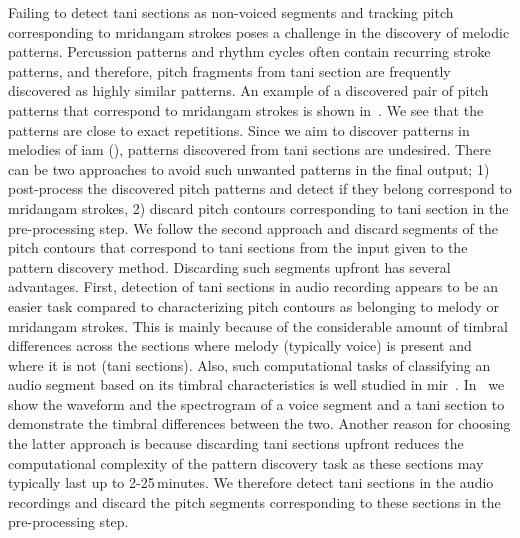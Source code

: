 {Failing to detect \gls{tani} sections as non-voiced segments and tracking pitch corresponding to \gls{mridangam} strokes poses a challenge in the discovery of melodic patterns. Percussion patterns and rhythm cycles often contain recurring stroke patterns, and therefore, pitch fragments from \gls{tani} section are frequently discovered as highly similar patterns. An example of a discovered pair of pitch patterns that correspond to \gls{mridangam} strokes is shown in~. We see that the patterns are close to exact repetitions. Since we aim to discover patterns in melodies of \gls{iam} (), patterns discovered from \gls{tani} sections are undesired. There can be two approaches to avoid such unwanted patterns in the final output; 1) post-process the discovered pitch patterns and detect if they belong correspond to \gls{mridangam} strokes, 2) discard pitch contours corresponding to \gls{tani} section in the pre-processing step. We follow the second approach and discard segments of the pitch contours that correspond to \gls{tani} sections from the input given to the pattern discovery method. Discarding such segments upfront has several advantages. First, detection of \gls{tani} sections in audio recording appears to be an easier task compared to characterizing pitch contours as belonging to melody or \gls{mridangam} strokes. This is mainly because of the considerable amount of timbral differences across the sections where melody (typically voice) is present and where it is not (\gls{tani} sections). Also, such computational tasks of classifying an audio segment based on its timbral characteristics is well studied in \gls{mir}~\citep{herrera2003automatic}. In~ we show the waveform and the spectrogram of a voice segment and a \gls{tani} section to demonstrate the timbral differences between the two. Another reason for choosing the latter approach is because discarding \gls{tani} sections upfront reduces the computational complexity of the pattern discovery task as these sections may typically last up to 2-25\,minutes. We therefore detect \gls{tani} sections in the audio recordings and discard the pitch segments corresponding to these sections in the pre-processing step.

}
